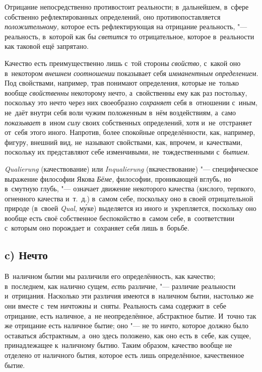 Отрицание непосредственно противостоит реальности; в~дальнейшем, в~сфере
собственно рефлектированных определений, оно противопоставляется
{\em положительному,} которое есть рефлектирующая на
отрицание реальность, "--- реальность, в~которой как бы
{\em светится} то отрицательное, которое в~реальности
как таковой ещё запрятано.

Качество есть преимущественно лишь с~той стороны {\em свойство,} с~какой оно
в~некотором {\em внешнем соотношении} показывает себя {\em имманентным
определением}. Под свойствами, например, трав понимают определения, которые
не~только вообще {\em свойственны} некоторому нечто, а~свойственны ему как раз
постольку, поскольку это нечто через них своеобразно {\em сохраняет} себя
в~отношении с~иным, не~даёт внутри себя воли чужим положенным в~нём
воздействиям, а~само {\em показывает} в~ином {\em силу} своих собственных
определений, хотя и~не~отстраняет от~себя этого иного. Напротив, более
спокойные определённости, как, например, фигуру, внешний вид, не~называют
свойствами, как, впрочем, и~качествами, поскольку их представляют себе
изменчивыми, не~тождественными с~{\em бытием}.

{\em Quali\-erung} (качествование) или {\em Inquali\-erung} (вкачествование)
"--- специфическое выражение философии Якова {\em Бёме,} философии, проникающей
вглубь, но в~смутную глубь, "--- означает движение некоторого качества
(кислого, терпкого, огненного качества и~т.~д.) в~самом себе, поскольку оно в
своей отрицательной природе (в~своей {\em Qual},
м\'{у}ке) выделяется из иного и~укрепляется, поскольку оно вообще есть своё
собственное беспокойство в~самом себе, в~соответствии с~которым оно порождает
и~сохраняет себя лишь в~борьбе.

\subsection[c) Нечто]{c) Нечто}

В~наличном бытии мы различили его определённость, как качество; в~последнем,
как налично сущем, {\em есть} различие, "--- различие реальности и~отрицания.
Насколько эти различия имеются в~наличном бытии, настолько же они вместе с~тем
ничтожны и~сняты. Реальность сама содержит в~себе отрицание, есть наличное,
а~не неопределённое, абстрактное бытие. И~точно так же отрицание есть наличное
бытие; оно "--- не то ничто, которое должно было оставаться абстрактным, а~оно
здесь положено, как оно есть в~себе, как сущее, принадлежащее к~наличному
бытию. Таким образом, качество вообще не отделено от наличного бытия, которое
есть лишь определённое, качественное бытие.

